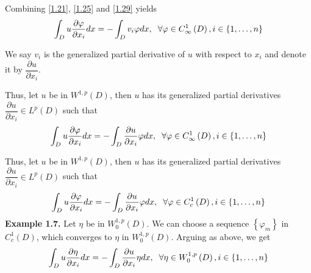 \documentclass[a4paper]{article}
\numberwithin{equation}{section}
\begin{document}
Combining \eqref{1.21}, \eqref{1.25} and \eqref{1.29} yields
\begin{align}
\int_D {u\dfrac{{\partial \varphi }}{{\partial {x_i}}}dx}  =  - \int_D {{v_i}\varphi dx} ,\hspace{0.2cm}\forall \varphi  \in C_\infty ^1\left( D \right),i \in \left\{ {1, \ldots ,n} \right\}
\end{align}

We say $v_i$ is the generalized partial derivative of $u$ with respect to $x_i$ and denote it by $\dfrac{{\partial u}}{{\partial {x_i}}}$.

Thus, let $u$ be in $W^{1,p}\left(D\right)$, then $u$ has its generalized partial derivatives $\dfrac{{\partial u}}{{\partial {x_i}}} \in {L^p}\left( D \right)$ such that
\begin{align}
\int_D {u\dfrac{{\partial \varphi }}{{\partial {x_i}}}dx}  =  - \int_D {\dfrac{{\partial u}}{{\partial {x_i}}}\varphi dx} ,\hspace{0.2cm}\forall \varphi  \in C_\infty ^1\left( D \right),i \in \left\{ {1, \ldots ,n} \right\}
\end{align}

Thus, let $u$ be in $W^{1,p}\left(D\right)$, then $u$ has its generalized partial derivatives $\dfrac{{\partial u}}{{\partial {x_i}}} \in {L^p}\left( D \right)$ such that
\begin{align}
\int_D {u\dfrac{{\partial \varphi }}{{\partial {x_i}}}dx}  =  - \int_D {\dfrac{{\partial u}}{{\partial {x_i}}}\varphi dx} ,\hspace{0.2cm}\forall \varphi  \in C_c ^1\left( D \right),i \in \left\{ {1, \ldots ,n} \right\}
\end{align}
\textbf{Example 1.7.} Let $\eta$ be in $W_0^{1,p}\left(D\right)$. We can choose a sequence $\left\{ {{\varphi _m}} \right\}$ in $C_c^1\left(D\right)$, which converges to $\eta$ in $W_0^{1,p}\left(D\right)$. Arguing as above, we get
\begin{align}
\int_D {u\dfrac{{\partial \eta }}{{\partial {x_i}}}dx}  =  - \int_D {\dfrac{{\partial u}}{{\partial {x_i}}}\eta dx} ,\hspace{0.2cm}\forall \eta  \in W_0^{1,p}\left( D \right),i \in \left\{ {1, \ldots ,n} \right\}
\end{align}
\end{document}
